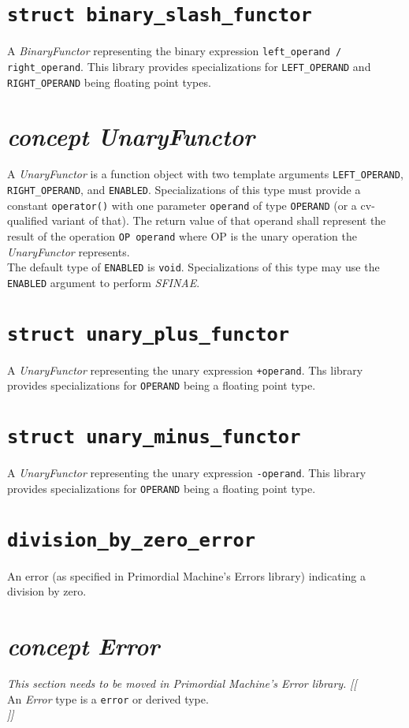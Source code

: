 \documentclass[oneside]{book}
\begin{document}
\section{\texttt{struct binary\_slash\_functor}}
A \textit{BinaryFunctor} representing the binary expression \verb|left_operand / right_operand|.
This library provides specializations for \texttt{LEFT\_OPERAND} and \texttt{RIGHT\_OPERAND} being floating point types.

\section{\textit{concept UnaryFunctor}}
A \textit{UnaryFunctor} is a function object with two template arguments \verb+LEFT_OPERAND+,
\verb+RIGHT_OPERAND+, and \verb+ENABLED+. Specializations of this type must provide a
constant \verb+operator()+ with one parameter \verb+operand+ of type \verb+OPERAND+
(or a cv-qualified variant of that). The return value of that operand shall represent the
result of the operation \verb+OP operand+ where OP is the unary operation
the \textit{UnaryFunctor} represents.\\

\noindent{}The default type of \verb+ENABLED+ is \verb+void+. Specializations of this type may use
the \verb+ENABLED+ argument to perform \textit{SFINAE}.

\section{\texttt{struct unary\_plus\_functor}}
A \textit{UnaryFunctor} representing the unary expression \verb|+operand|.
Ths library provides specializations for \texttt{OPERAND} being a floating point type.

\section{\texttt{struct unary\_minus\_functor}}
A \textit{UnaryFunctor} representing the unary expression \verb|-operand|.
This library provides specializations for \texttt{OPERAND} being a floating point type.

\section{\texttt{division\_by\_zero\_error}}
An error (as specified in Primordial Machine's Errors library) indicating a division by zero.

\section{\textit{concept Error}}
\textit{\color{orange}This section needs to be moved in Primordial Machine's Error library.}
\noindent\textit{\color{orange}[[}\\
An \textit{Error} type is a \texttt{error} or derived type.\\
\noindent\textit{\color{orange}]]}
\end{document}
